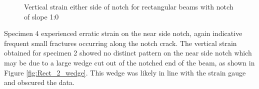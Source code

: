 \documentclass[11pt,a4paper]{article}
\numberwithin{equation}{subsection}
\begin{document}
\vspace*{\baselineskip}

\begin{figure}[h]
	\begin{center}
	\end{center}
	\caption{Vertical strain either side of notch for rectangular beams with notch of slope 1:0}
	\label{fig:Rect_10_Y}
\end{figure}
\pagebreak

\noindent
Specimen 4 experienced erratic strain on the near side notch, again indicative frequent small fractures occurring along the notch crack. The vertical strain obtained for specimen 2 showed no distinct pattern on the near side notch which may be due to a large wedge cut out of the notched end of the beam, as shown in Figure \ref{fig:Rect_2_wedge}. This wedge was likely in line with the strain gauge and obscured the data. 
\vspace*{\baselineskip}
\end{document}
